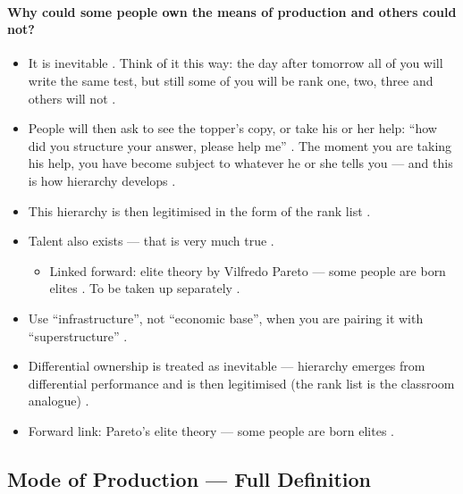 \paragraph{Why could some people own the means of production and others could not?}
\begin{itemize}
    \item It is inevitable . Think of it this way: the day after tomorrow all of you will write the same test, but still some of you will be rank one, two, three and others will not .
    \item People will then ask to see the topper's copy, or take his or her help: ``how did you structure your answer, please help me'' . The moment you are taking his help, you have become subject to whatever he or she tells you --- and this is how hierarchy develops .
    \item This hierarchy is then legitimised in the form of the rank list .
    \item Talent also exists --- that is very much true .
    \begin{itemize}
        \item Linked forward: elite theory by Vilfredo Pareto --- some people are born elites . To be taken up separately .
    \end{itemize}
\end{itemize}

\begin{QuickRevision}
\begin{itemize}
    \item Use ``infrastructure'', not ``economic base'', when you are pairing it with ``superstructure'' .
    \item Differential ownership is treated as inevitable --- hierarchy emerges from differential performance and is then legitimised (the rank list is the classroom analogue) .
    \item Forward link: Pareto's elite theory --- some people are born elites .
\end{itemize}
\end{QuickRevision}

\subsection{Mode of Production --- Full Definition}

